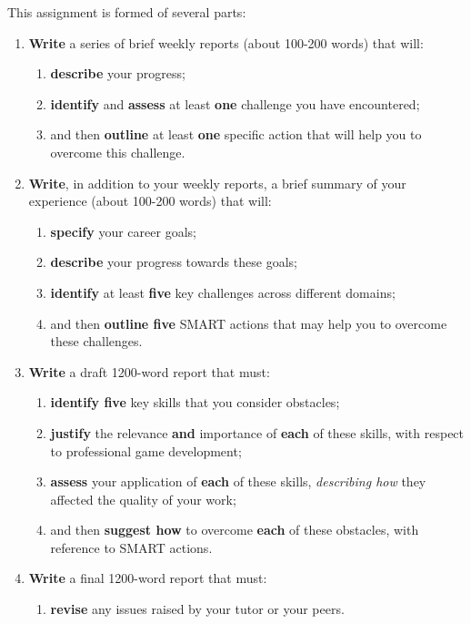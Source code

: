 \documentclass{../../fal_assignment}
\begin{document}
This assignment is formed of several parts:

\begin{enumerate}[label=(\Alph*)]
    \item \textbf{Write} a series of brief weekly reports (about 100-200 words) that will:
    	\begin{enumerate}[label=\roman*.]
    		\item \textbf{describe} your progress;
    		\item \textbf{identify} and \textbf{assess} at least \textbf{one} challenge you have encountered;
    		\item and then \textbf{outline} at least \textbf{one} specific action that will help you to overcome this challenge.
	\end{enumerate}
	    \item \textbf{Write}, in addition to your weekly reports, a brief summary of your experience (about 100-200 words) that will:
    	\begin{enumerate}[label=\roman*.]
    		\item \textbf{specify} your career goals;
    		\item \textbf{describe} your progress towards these goals;
    		\item \textbf{identify} at least \textbf{five} key challenges across different domains;
    		\item and then \textbf{outline five} SMART actions that may help you to overcome these challenges.
	\end{enumerate}
    \item \textbf{Write} a draft 1200-word report that must:
    	\begin{enumerate}[label=\roman*.]
    		\item \textbf{identify five} key skills that you consider obstacles;
    		\item \textbf{justify} the relevance \textbf{and} importance of \textbf{each} of these skills, with respect to professional game development;
    		\item \textbf{assess} your application of \textbf{each} of these skills, \textit{describing how} they affected the quality of your work;
    		\item and then \textbf{suggest how} to overcome \textbf{each} of these obstacles, with reference to SMART actions.
	\end{enumerate}
    \item \textbf{Write} a final 1200-word report that must:
    	\begin{enumerate}[label=\roman*.]
    		\item \textbf{revise} any issues raised by your tutor or your peers.
	\end{enumerate}
\end{enumerate}
\end{document}
